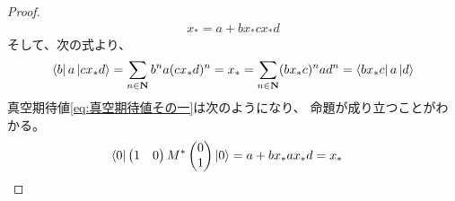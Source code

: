 {\begin{proof}
\begin{equation*}
\begin{split}
			x_* = a + bx_*cx_*d
		\end{split}\end{equation*}
		そして、次の式より、
		\begin{equation*}\begin{split}
			\mathinner{\langle{b}|}a\mathinner{|{cx_*d}\rangle} = \sum_{n\in\mathbf{N}}b^na(cx_*d)^n 
			= x_* = \sum_{n\in\mathbf{N}}(bx_*c)^nad^n = \mathinner{\langle{bx_*c}|}a\mathinner{|{d}\rangle}
		\end{split}\end{equation*}
		真空期待値\eqref{eq:真空期待値その一}は次のようになり、
		命題が成り立つことがわかる。
		\begin{equation*}\begin{split}
			\mathinner{\langle{0}|}\begin{pmatrix}
				1 & 0
			\end{pmatrix}M^*\begin{pmatrix}
				0 \\ 1
			\end{pmatrix}\mathinner{|{0}\rangle} &= a + bx_*ax_*d = x_*
		\end{split}\end{equation*}
	\end{proof} %

}

